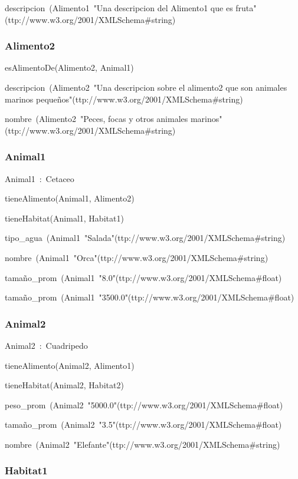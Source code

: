 descripcion~(Alimento1~"Una descripcion del Alimento1 que es fruta"^^http://www.w3.org/2001/XMLSchema\#string)

\subsubsection*{Alimento2}

esAlimentoDe(Alimento2, Animal1)

descripcion~(Alimento2~"Una descripcion sobre el alimento2 que son animales marinos pequeños"^^http://www.w3.org/2001/XMLSchema\#string)

nombre~(Alimento2~"Peces, focas y otros animales marinos"^^http://www.w3.org/2001/XMLSchema\#string)

\subsubsection*{Animal1}

Animal1~:~Cetaceo

tieneAlimento(Animal1, Alimento2)

tieneHabitat(Animal1, Habitat1)

tipo\_agua~(Animal1~"Salada"^^http://www.w3.org/2001/XMLSchema\#string)

nombre~(Animal1~"Orca"^^http://www.w3.org/2001/XMLSchema\#string)

tamaño\_prom~(Animal1~"8.0"^^http://www.w3.org/2001/XMLSchema\#float)

tamaño\_prom~(Animal1~"3500.0"^^http://www.w3.org/2001/XMLSchema\#float)

\subsubsection*{Animal2}

Animal2~:~Cuadripedo

tieneAlimento(Animal2, Alimento1)

tieneHabitat(Animal2, Habitat2)

peso\_prom~(Animal2~"5000.0"^^http://www.w3.org/2001/XMLSchema\#float)

tamaño\_prom~(Animal2~"3.5"^^http://www.w3.org/2001/XMLSchema\#float)

nombre~(Animal2~"Elefante"^^http://www.w3.org/2001/XMLSchema\#string)

\subsubsection*{Habitat1}

